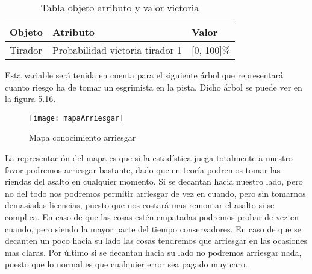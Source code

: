 \begin{longtable}{lll}
  \caption{Tabla objeto atributo y valor victoria}
  \label{tab:Tabla objeto atributo y valor victoria}

  \endfirsthead
  \endhead

  Objeto & Atributo & Valor \\ \hline
  \multicolumn{1}{l|}{Tirador} & Probabilidad victoria tirador 1 & [0, 100]\%
\end{longtable}

Esta variable será tenida en cuenta para el siguiente árbol que representará
cuanto riesgo ha de tomar un esgrimista en la pista. Dicho árbol se puede
ver en la \hyperref[fig:Mapa conocimiento arriesgar]{figura 5.16}.

\begin{figure}[htb]
  \centering
    \texttt{[image: mapaArriesgar]}
  \caption[Mapa conocimiento arriesgar]{Mapa conocimiento arriesgar}
  \label{fig:Mapa conocimiento arriesgar}
\end{figure}

La representación del mapa es que si la estadística juega totalmente a nuestro favor
podremos arriesgar bastante, dado que en teoría podremos tomar las riendas del asalto
en cualquier momento. Si se decantan hacia nuestro lado, pero no del todo nos podremos
permitir arriesgar de vez en cuando, pero sin tomarnos demasiadas licencias, puesto que
nos costará mas remontar el asalto si se complica. En caso de que las cosas estén empatadas
podremos probar de vez en cuando, pero siendo la mayor parte del tiempo conservadores. En
caso de que se decanten un poco hacia su lado las cosas tendremos que arriesgar en las ocasiones
mas claras. Por último si se decantan hacia su lado no podremos arriesgar nada, puesto que lo normal
es que cualquier error sea pagado muy caro.
